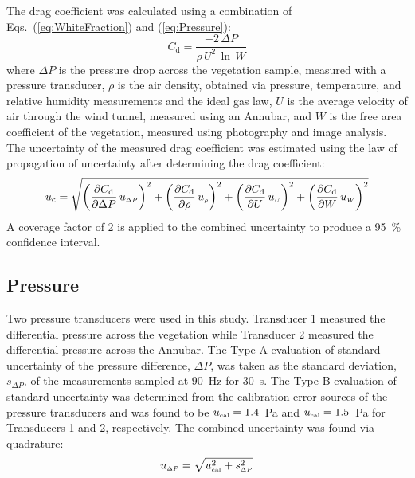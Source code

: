 \documentclass[12pt]{article}
\begin{document}
The drag coefficient was calculated using a combination of Eqs.~(\ref{eq:WhiteFraction}) and (\ref{eq:Pressure}):
\begin{equation}\label{eq:drag_coefficient}
  C_\mathrm{d} = \frac{-2 \, \Delta P}{\rho \, U^2 \, \ln \, W}
\end{equation}
where $\Delta P$ is the pressure drop across the vegetation sample, measured with a pressure transducer, $\rho$ is the air density, obtained via pressure, temperature, and relative humidity measurements and the ideal gas law, $U$ is the average velocity of air through the wind tunnel, measured using an Annubar, and $W$ is the free area coefficient of the vegetation, measured using photography and image analysis. The uncertainty of the measured drag coefficient was estimated using the law of propagation of uncertainty after determining the drag coefficient:
\begin{equation}
\label{eq:DragUncertainty}
u_\mathrm{c} = \sqrt{{\left( \frac{\partial C_{\rm d}}{\partial \Delta P}\,u_{\scriptscriptstyle \Delta P} \right)}^2+{\left(\frac{\partial C_{\rm d}}{\partial \rho}\,u_{\scriptscriptstyle \rho}\right)}^2+{\left(\frac{\partial C_{\rm d}}{\partial U}\,u_{\scriptscriptstyle U}\right)}^2+{\left(\frac{\partial C_{\rm d}}{\partial W}\,u_{\scriptscriptstyle W}\right)}^2}
\end{equation}
A coverage factor of 2 is applied to the combined uncertainty to produce a 95~\% confidence interval.


\subsection{Pressure}
\label{ssec:PressUncertainty}

Two pressure transducers were used in this study. Transducer 1 measured the differential pressure across the vegetation while Transducer 2 measured the differential pressure across the Annubar. The Type A evaluation of standard uncertainty of the pressure difference, $\Delta P$, was taken as the standard deviation, $s_{\scriptscriptstyle \Delta P}$, of the measurements sampled at 90~\si{Hz} for 30~\si{s}. The Type B evaluation of standard uncertainty was determined from the calibration error sources of the pressure transducers and was found to be $u_{\rm \scriptscriptstyle cal}=1.4$~Pa and $u_{\rm \scriptscriptstyle cal}=1.5$~Pa for Transducers 1 and 2, respectively. The combined uncertainty was found via quadrature:
\begin{equation}
\label{eq:pressureuncertainty}
u_{\scriptscriptstyle \Delta P} = \sqrt{ u_{\rm \scriptscriptstyle cal}^2 + s_{\scriptscriptstyle \Delta P}^2}
\end{equation}
\end{document}
